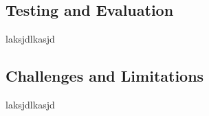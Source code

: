 \subsection{Testing and Evaluation}
laksjdlkasjd

\subsection{Challenges and Limitations}
laksjdlkasjd
